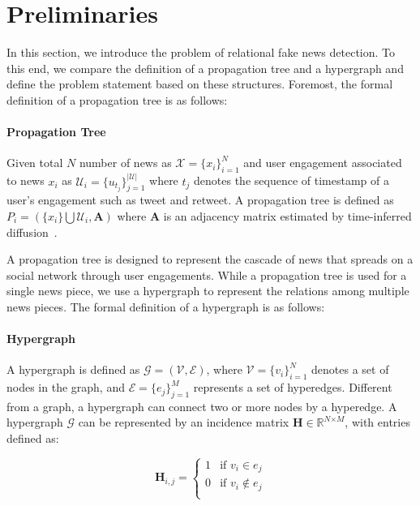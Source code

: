 \documentclass[conference]{IEEEtran}
\begin{document}
\section{Preliminaries}
In this section, we introduce the problem of relational fake news detection. To this end, we compare the definition of a propagation tree and a hypergraph and define the problem statement based on these structures. Foremost, the formal definition of a propagation tree is as follows:

\hfill

\paragraph{\textbf{Propagation Tree}}
Given total $\mathit{N}$ number of news as $\mathcal{X} = \{x_i\}^\mathit{N}_{i=1}$ and user engagement associated to news $x_i$ as $\mathcal{U}_i = \{u_{t_j}\}^\mathit{|\mathcal{U}|}_{j=1}$ where $t_j$ denotes the sequence of timestamp of a user's engagement such as tweet and retweet. A propagation tree is defined as $P_i = ( \{x_i\} \bigcup \mathcal{U}_i , \mathbf{A} )$ where $\mathbf{A}$ is an adjacency matrix estimated by time-inferred diffusion~\cite{vosoughi2018spread}.


\hfill

A propagation tree is designed to represent the cascade of news that spreads on a social network through user engagements. While a propagation tree is used for a single news piece, we use a hypergraph to represent the relations among multiple news pieces. The formal definition of a hypergraph is as follows:

\hfill

\paragraph{\textbf{Hypergraph}}
A hypergraph is defined as $\mathcal{G} = (\mathcal{V}, \mathcal{E})$, where $\mathcal{V} = \{v_i\}^\mathit{N}_{i=1}$ denotes a set of nodes in the graph, and $\mathcal{E} =  \{e_j\}^\mathit{M}_{j=1}$ represents a set of hyperedges. Different from a graph, a hypergraph can connect two or more nodes by a hyperedge. A hypergraph $\mathcal{G}$ can be represented by an incidence matrix $\mathbf{H} \in \mathds{R}^{\textit{N} \times \textit{M}}$, with entries defined as:

\begin{equation}
\mathbf{H}_{i,j} = 
    \begin{cases}
      1 & \text{if $v_{i} \in e_{j}$}\\
      0 & \text{if $v_{i} \notin e_{j}$}\\
    \end{cases}
\end{equation}
\end{document}
